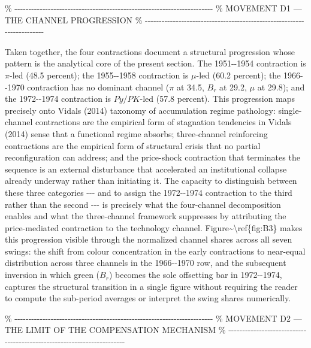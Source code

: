 \%
-\/-\/-\/-\/-\/-\/-\/-\/-\/-\/-\/-\/-\/-\/-\/-\/-\/-\/-\/-\/-\/-\/-\/-\/-\/-\/-\/-\/-\/-\/-\/-\/-\/-\/-\/-\/-\/-\/-\/-\/-\/-\/-\/-\/-\/-\/-\/-\/-\/-\/-\/-\/-\/-\/-\/-\/-\/-\/-\/-\/-\/-\/-\/-\/-\/-\/-\/-\/-\/-\/-
\% MOVEMENT D1 --- THE CHANNEL PROGRESSION \%
-\/-\/-\/-\/-\/-\/-\/-\/-\/-\/-\/-\/-\/-\/-\/-\/-\/-\/-\/-\/-\/-\/-\/-\/-\/-\/-\/-\/-\/-\/-\/-\/-\/-\/-\/-\/-\/-\/-\/-\/-\/-\/-\/-\/-\/-\/-\/-\/-\/-\/-\/-\/-\/-\/-\/-\/-\/-\/-\/-\/-\/-\/-\/-\/-\/-\/-\/-\/-\/-\/-

Taken together, the four contractions document a structural progression
whose pattern is the analytical core of the present section. The
1951-\/-1954 contraction is \(\pi\)-led (48.5 percent); the 1955-\/-1958
contraction is \(\mu\)-led (60.2 percent); the 1966-\/-1970 contraction
has no dominant channel (\(\pi\) at 34.5, \(B_{r}\) at 29.2, \(\mu\) at
29.8); and the 1972-\/-1974 contraction is \(Py/PK\)-led (57.8 percent).
This progression maps precisely onto Vidal\textquotesingle s (2014)
taxonomy of accumulation regime pathology: single-channel contractions
are the empirical form of stagnation tendencies in
Vidal\textquotesingle s (2014) sense that a functional regime absorbs;
three-channel reinforcing contractions are the empirical form of
structural crisis that no partial reconfiguration can address; and the
price-shock contraction that terminates the sequence is an external
disturbance that accelerated an institutional collapse already underway
rather than initiating it. The capacity to distinguish between these
three categories -\/-\/- and to assign the 1972-\/-1974 contraction to
the third rather than the second -\/-\/- is precisely what the
four-channel decomposition enables and what the three-channel framework
suppresses by attributing the price-mediated contraction to the
technology channel. Figure\textasciitilde\textbackslash ref\{fig:B3\}
makes this progression visible through the normalized channel shares
across all seven swings: the shift from colour concentration in the
early contractions to near-equal distribution across three channels in
the 1966-\/-1970 row, and the subsequent inversion in which green
(\(B_{r}\)) becomes the sole offsetting bar in 1972-\/-1974, captures
the structural transition in a single figure without requiring the
reader to compute the sub-period averages or interpret the swing shares
numerically.

\%
-\/-\/-\/-\/-\/-\/-\/-\/-\/-\/-\/-\/-\/-\/-\/-\/-\/-\/-\/-\/-\/-\/-\/-\/-\/-\/-\/-\/-\/-\/-\/-\/-\/-\/-\/-\/-\/-\/-\/-\/-\/-\/-\/-\/-\/-\/-\/-\/-\/-\/-\/-\/-\/-\/-\/-\/-\/-\/-\/-\/-\/-\/-\/-\/-\/-\/-\/-\/-\/-\/-
\% MOVEMENT D2 --- THE LIMIT OF THE COMPENSATION MECHANISM \%
-\/-\/-\/-\/-\/-\/-\/-\/-\/-\/-\/-\/-\/-\/-\/-\/-\/-\/-\/-\/-\/-\/-\/-\/-\/-\/-\/-\/-\/-\/-\/-\/-\/-\/-\/-\/-\/-\/-\/-\/-\/-\/-\/-\/-\/-\/-\/-\/-\/-\/-\/-\/-\/-\/-\/-\/-\/-\/-\/-\/-\/-\/-\/-\/-\/-\/-\/-\/-\/-\/-

